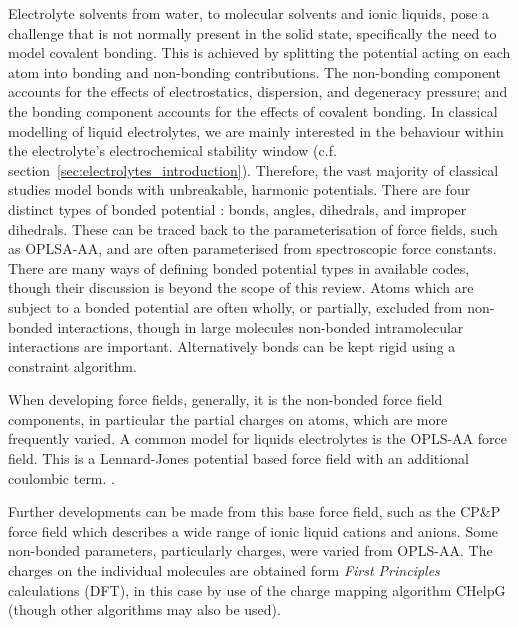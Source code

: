 \documentclass[../main.tex]{subfiles}
\begin{document}
Electrolyte solvents from water, to molecular solvents and ionic liquids, pose a challenge that is not normally present in the solid state, specifically the need to model covalent bonding. This is achieved by splitting the potential acting on each atom into bonding and non-bonding contributions. The non-bonding component accounts for the effects of electrostatics, dispersion, and degeneracy pressure; and the bonding component accounts for the effects of covalent bonding. In classical modelling of liquid electrolytes, we are mainly interested in the behaviour within the electrolyte's electrochemical stability window (c.f. section~\ref{sec:electrolytes_introduction}). Therefore, the vast majority of classical studies model bonds with unbreakable, harmonic potentials. There are four distinct types of bonded potential \cite{lindahl_gromacs_2021, frenkel_understanding_2002}: bonds, angles, dihedrals, and improper dihedrals. These can be traced back to the parameterisation of force fields, such as OPLSA-AA\cite{canongia_lopes_clp_2012, jorgensen_development_1996}, and are often parameterised from spectroscopic force constants. There are many ways of defining bonded potential types in available codes\cite{lindahl_gromacs_2021,PLIMPTON19951}, though their discussion is beyond the scope of this review. Atoms which are subject to a bonded potential are often wholly, or partially, excluded from non-bonded interactions, though in large molecules non-bonded intramolecular interactions are important. Alternatively bonds can be kept rigid using a constraint algorithm\cite{hess_lincs_1997,ryckaert_numerical_1977,andersen_rattle_1983}.

When developing force fields, generally, it is the non-bonded force field components, in particular the partial charges on atoms, which are more frequently varied. A common model for liquids electrolytes is the OPLS-AA force field.\cite{jorgensen_development_1996} This is a Lennard-Jones potential based force field with an additional coulombic term. \cite{ewald_berechnung_1921,darden_particle_1993,deserno_how_1998,yeh_ewald_1999}.

Further developments can be made from this base force field, such as the CP\&P force field \cite{canongia_lopes_clp_2012, canongia_lopes_modeling_2004, canongia_lopes_molecular_2004, canongia_lopes_molecular_2006} which describes a wide range of ionic liquid cations and anions. Some non-bonded parameters, particularly charges, were varied from OPLS-AA. The charges on the individual molecules are obtained form \textit{First Principles} calculations (DFT), in this case by use of the charge mapping algorithm CHelpG\cite{canongia_lopes_clp_2012} (though other algorithms may also be used\cite{spackman_potential_1996,breneman_determining_1990,singh_approach_1984}). 
\end{document}
